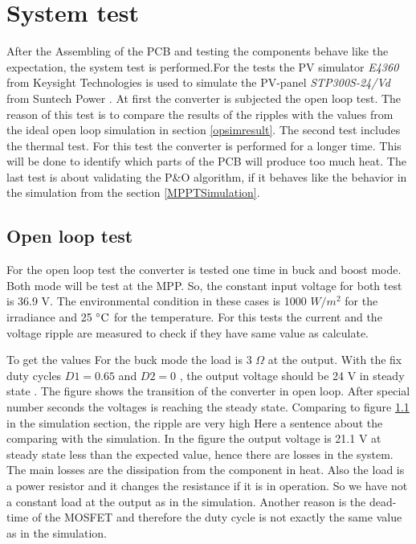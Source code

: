 \section{System test}
After the Assembling of the PCB and testing the components behave like the expectation, the system test is performed.For the tests the PV simulator \textit{E4360} from Keysight Technologies \cite{PV_simulator} is used to simulate the PV-panel \textit{STP300S-24/Vd} from Suntech Power \cite{PV_panel}. At first the converter is subjected the open loop test. The reason of this test is to compare the results of the ripples with the values from the ideal open loop simulation in section \ref{opsimresult}. The second test includes the thermal test. For this test the converter is performed for a longer time. This will be done to identify which parts of the PCB will produce too much heat. The last test is about validating the P\&O algorithm, if it behaves like the behavior in the simulation from the section \ref{MPPTSimulation}.

\subsection{Open loop test}
For the open loop test the converter is tested one time in buck and boost mode. Both mode will be test at the MPP. So, the constant input voltage for both test is 36.9 V. The environmental condition in these cases is 1000 $W /m^2$ for the irradiance and 25 $\decC$ for the temperature. For this tests the current and the voltage ripple are measured to check if they have same value as calculate. %

To get the values 
For the buck mode the load is 3 $\Omega$ at the output. With the fix duty cycles $D1 = 0.65$ and  $D2 = 0$ , the output voltage should be 24 V in steady state . The figure shows the transition of the converter in open loop. After special number seconds  the voltages is reaching the steady state. Comparing to figure \ref{} in the simulation section, the ripple are very high Here a sentence about the comparing with the simulation.  In the figure the output voltage is 21.1 V  at steady state less than the expected value, hence there are losses in the system.
The main losses are the dissipation from the component in heat. Also the load is a power resistor and it changes the resistance if it is in operation. So we have not a constant load at the output as in the simulation. Another reason is the dead-time of the MOSFET and therefore the duty cycle is not exactly the same value as in the simulation. 

